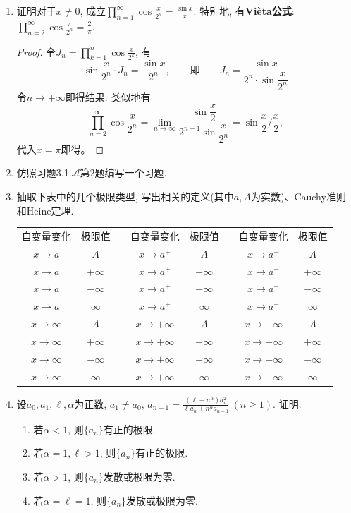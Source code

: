 \begin{1b}
\begin{enumerate}
\item 证明对于\(x\ne 0\), 成立\(\prod_{n=1}^{\infty}\cos\frac{x}{2^n}=\frac{\sin x}{x}\). 特别地, 有\textbf{Vi\`{e}ta公式}: \(\prod_{n=2}^{\infty}\cos\frac{\pi}{2^n}=\frac{2}{\pi}\).
\begin{proof}
令\(J_n=\prod_{k=1}^{n}\cos\frac{x}{2^k}\), 有
\[\sin\frac{x}{2^n}\cdot J_n=\frac{\sin x}{2^n},\qquad\text{即}\qquad J_n=\frac{\sin x}{2^n\cdot\sin\dfrac{x}{2^n}}\]
令\(n\rightarrow+\infty\)即得结果. 类似地有
\[\prod_{n=2}^{\infty}\cos\frac{x}{2^n}
=\lim_{n\to\infty}\frac{\sin\dfrac{x}{2}}{2^{n-1}\sin\dfrac{x}{2^n}}
=\sin\frac{x}{2}\Big/\frac{x}{2},\]
代入$x=\pi$即得。
\end{proof}
\item 仿照习题3.1.\(\boldsymbol{\mathcal{A}}\)第2题编写一个习题.
\item 抽取下表中的几个极限类型, 写出相关的定义(其中\(a,A\)为实数)、Cauchy准则和Heine定理.
\begin{table}
    \begin{tabular}{|c|c|c|c|c|c|c|c|}
        \hline
        自变量变化&极限值&&自变量变化&极限值&&自变量变化&极限值\\
         \(x\rightarrow a\)&\(A\)&&\(x\rightarrow a^+\)&\(A\)&&\(x\rightarrow a^-\)&\(A\)\\
         \(x\rightarrow a\)&\(+\infty\)&&\(x\rightarrow a^+\)&\(+\infty\)&&\(x\rightarrow a^-\)&\(+\infty\)\\
         \(x\rightarrow a\)&\(-\infty\)&&\(x\rightarrow a^+\)&\(-\infty\)&&\(x\rightarrow a^-\)&\(-\infty\)\\
         \(x\rightarrow a\)&\(\infty\)&&\(x\rightarrow a^+\)&\(\infty\)&&\(x\rightarrow a^-\)&\(\infty\)\\
         \(x\rightarrow \infty\)&\(A\)&&\(x\rightarrow +\infty\)&\(A\)&&\(x\rightarrow -\infty\)&\(A\)\\
         \(x\rightarrow \infty\)&\(+\infty\)&&\(x\rightarrow +\infty\)&\(+\infty\)&&\(x\rightarrow -\infty\)&\(+\infty\)\\
         \(x\rightarrow \infty\)&\(-\infty\)&&\(x\rightarrow +\infty\)&\(-\infty\)&&\(x\rightarrow -\infty\)&\(-\infty\)\\
         \(x\rightarrow \infty\)&\(\infty\)&&\(x\rightarrow +\infty\)&\(\infty\)&&\(x\rightarrow -\infty\)&\(\infty\)
    \end{tabular}
\end{table}
\item 设\(a_0,a_1,\ell,\alpha\)为正数, \(a_1\ne a_0,\,a_{n+1}=\frac{(\ell+n^\alpha)a_n^2}{\ell a_n+n^\alpha a_{n-1}}\ (n\geqslant 1)\). 证明:
\begin{enumerate}[label=(\arabic*)]
\item 若\(\alpha<1\), 则\(\{a_n\}\)有正的极限.
\item 若\(\alpha=1, \ell>1\), 则\(\{a_n\}\)有正的极限.
\item 若\(\alpha>1\), 则\(\{a_n\}\)发散或极限为零.
\item 若\(\alpha=\ell=1\), 则\(\{a_n\}\)发散或极限为零.
\end{enumerate}
\end{enumerate}
\end{1b}

